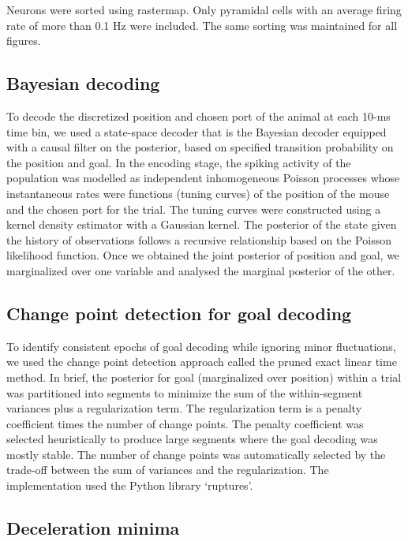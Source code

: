 Neurons were sorted using rastermap. Only pyramidal cells with an average firing rate of more than 0.1 Hz were included. The same sorting was maintained for all figures.

\subsection{Bayesian decoding}

To decode the discretized position and chosen port of the animal at each 10-ms time bin, we used a state-space decoder that is the Bayesian decoder equipped with a causal filter on the posterior, based on specified transition probability on the position and goal. In the encoding stage, the spiking activity of the population was modelled as independent inhomogeneous Poisson processes whose instantaneous rates were functions (tuning curves) of the position of the mouse and the chosen port for the trial. The tuning curves were constructed using a kernel density estimator with a Gaussian kernel. The posterior of the state given the history of observations follows a recursive relationship based on the Poisson likelihood function. Once we obtained the joint posterior of position and goal, we marginalized over one variable and analysed the marginal posterior of the other.

\subsection{Change point detection for goal decoding}

To identify consistent epochs of goal decoding while ignoring minor fluctuations, we used the change point detection approach called the pruned exact linear time method. In brief, the posterior for goal (marginalized over position) within a trial was partitioned into segments to minimize the sum of the within-segment variances plus a regularization term. The regularization term is a penalty coefficient times the number of change points. The penalty coefficient was selected heuristically to produce large segments where the goal decoding was mostly stable. The number of change points was automatically selected by the trade-off between the sum of variances and the regularization. The implementation used the Python library `ruptures'.

\subsection{Deceleration minima}

